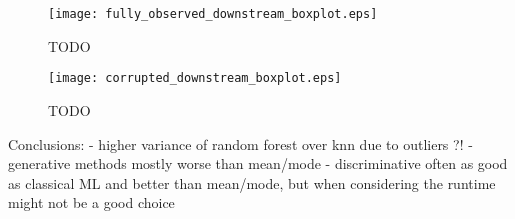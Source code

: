 
\begin{figure}\centering
	\texttt{[image: fully\_observed\_downstream\_boxplot.eps]}

	\caption[TODO]{TODO}
	\label{fig:fully_observed_downstream_boxplot}
\end{figure}

\begin{figure}\centering
	\texttt{[image: corrupted\_downstream\_boxplot.eps]}

	\caption[TODO]{TODO}
	\label{fig:corrupted_downstream_boxplot}
\end{figure}



Conclusions:
- higher variance of random forest over knn due to outliers ?!
- generative methods mostly worse than mean/mode
- discriminative often as good as classical ML and better than mean/mode, but when considering the runtime might not be a good choice
